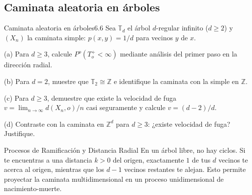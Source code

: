 \documentclass[10pt,a4paper]{article}
\begin{document}
\newpage


\subsection{Caminata aleatoria en árboles}

\vspace{5mm}

\begin{ejercicio}{Caminata aleatoria en árboles}{6.6}
    Sea $\mathbb{T}_d$ el árbol $d$-regular infinito ($d \ge 2$) y $(X_n)$ la caminata simple: $p(x, y) = 1/d$ para vecinos $y$ de $x$.
    
    (a) Para $d \ge 3$, calcule $P^o(T_o^+ < \infty)$ mediante análisis del primer paso en la dirección radial.
    
    (b) Para $d = 2$, muestre que $\mathbb{T}_2 \cong \mathbb{Z}$ e identifique la caminata con la simple en $\mathbb{Z}$.
    
    (c) Para $d \ge 3$, demuestre que existe la velocidad de fuga $v = \lim_{n \to \infty} d(X_n, o)/n$ casi seguramente y calcule $v = (d - 2)/d$.
    
    (d) Contraste con la caminata en $\mathbb{Z}^d$ para $d \ge 3$: ¿existe velocidad de fuga? Justifique.
\end{ejercicio}

\vspace{2mm}

\begin{nota}{Procesos de Ramificación y Distancia Radial}
    En un árbol libre, no hay ciclos. Si te encuentras a una distancia $k > 0$ del origen, exactamente $1$ de tus $d$ vecinos te acerca al origen, mientras que los $d-1$ vecinos restantes te alejan. Esto permite proyectar la caminata multidimensional en un proceso unidimensional de nacimiento-muerte.
\end{nota}
\end{document}
